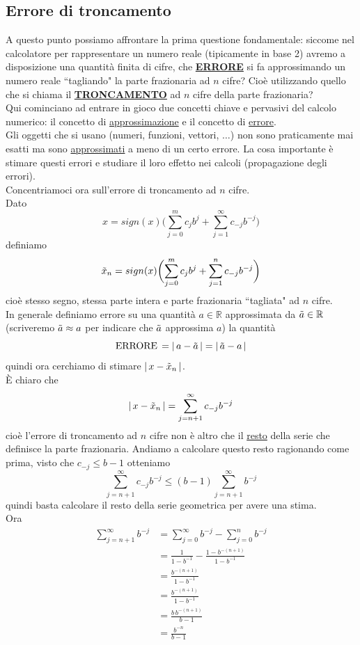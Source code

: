 \documentclass[12pt]{article}
\begin{document}
\subsection{Errore di troncamento}
A questo punto possiamo affrontare la prima questione fondamentale: siccome nel calcolatore per rappresentare un numero reale (tipicamente in base 2) avremo a disposizione una quantità finita di cifre, che \uline{\textbf{ERRORE}} si fa approssimando un numero reale ``tagliando" la parte frazionaria ad $n$ cifre? Cioè utilizzando quello che si chiama il \uline{\textbf{TRONCAMENTO}} ad $n$ cifre della parte frazionaria? \\
Qui cominciano ad entrare in gioco due concetti chiave e pervasivi del calcolo numerico: il concetto di \uline{approssimazione} e il concetto di \uline{errore}. \\
Gli oggetti che si usano (numeri, funzioni, vettori, $\dotsc$) non sono praticamente mai esatti ma sono \uline{approssimati} a meno di un certo errore. La cosa importante è stimare questi errori e studiare il loro effetto nei calcoli (propagazione degli errori). \\
Concentriamoci ora sull'errore di troncamento ad $n$ cifre.\\
Dato \[ x = sign(x) \biggl( \sum_{j=0}^m c_j b^j + \sum_{j=1}^\infty c_{-j} b^{-j} \biggr) \]
definiamo \[ \Tilde{x}_n = sign(x) \biggl( \sum_{j=0}^m c_j b^j + \sum_{j=1}^n c_{-j} b^{-j} \biggr) \]
cioè stesso segno, stessa parte intera e parte frazionaria ``tagliata" ad $n$ cifre. \\
In generale definiamo errore su una quantità $a \in \mathbb{R}$ approssimata da $\Tilde{a} \in \mathbb{R}$ (scriveremo $\Tilde{a} \approx a$ per indicare che $\Tilde{a}$ approssima $a$) la quantità \[ \text{ERRORE}\,= \lvert \, a - \Tilde{a} \,\rvert = \lvert \, \Tilde{a} - a \,\rvert \]
quindi ora cerchiamo di stimare $\lvert \, x - \Tilde{x}_n \,\rvert$. \\
È chiaro che \[ \lvert \, x - \Tilde{x}_n \,\rvert = \sum_{j=n+1}^\infty c_{-j} b^{-j} \]
cioè l'errore di troncamento ad $n$ cifre non è altro che il \uline{resto} della serie che definisce la parte frazionaria. Andiamo a calcolare questo resto ragionando come prima, visto che $c_{-j} \le b - 1$ otteniamo
\[ \sum_{j=n+1}^{\infty} c_{-j}b^{-j} \le (b-1)\sum_{j=n+1}^{\infty} b^{-j} \]
quindi basta calcolare il resto della serie geometrica per avere una stima. \\
Ora
\[ \begin{split}
    \sum_{j=n+1}^{\infty} b^{-j} & = \sum_{j=0}^{\infty} b^{-j} - \sum_{j=0}^{n} b^{-j} \\
    & = \frac{1}{1 - b^{-1}} - \frac{1 - b^{-(n+1)}}{1 - b^{-1}} \\
    & = \frac{b^{-(n+1)}}{1 - b^{-1}} \\
    & = \frac{b^{-(n+1)}}{1 - b^{-1}} \\
    & = \frac{b\,b^{-(n+1)}}{b - 1} \\
    & = \frac{b^{-n}}{b - 1}
\end{split} \]
\end{document}
